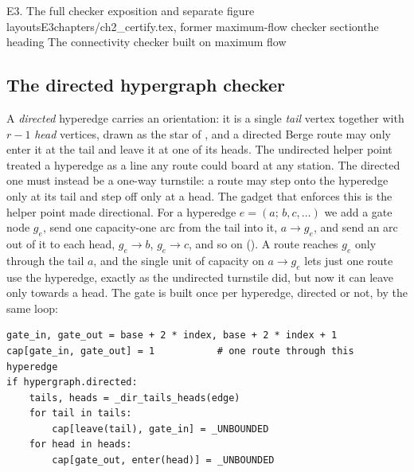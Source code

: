 \begin{offcut}{E3. The full checker exposition and separate figure layouts}{E3}{chapters/ch2\_certify.tex, former maximum-flow checker section}{the heading The connectivity checker built on maximum flow}
\subsection{The directed hypergraph checker}
A \emph{directed} hyperedge carries an orientation: it is a single \emph{tail} vertex together with $r-1$ \emph{head} vertices, drawn as the star of , and a directed Berge route may only enter it at the tail and leave it at one of its heads. The undirected helper point treated a hyperedge as a line any route could board at any station. The directed one must instead be a one-way turnstile: a route may step onto the hyperedge only at its tail and step off only at a head. The gadget that enforces this is the helper point made directional. For a hyperedge $e = (a;\, b, c, \dots)$ we add a gate node $g_e$, send one capacity-one arc from the tail into it, $a \to g_e$, and send an arc out of it to each head, $g_e \to b$, $g_e \to c$, and so on (). A route reaches $g_e$ only through the tail $a$, and the single unit of capacity on $a \to g_e$ lets just one route use the hyperedge, exactly as the undirected turnstile did, but now it can leave only towards a head. The gate is built once per hyperedge, directed or not, by the same loop:

\begin{lstlisting}[caption={The gate loop behind \Cref{fig:hyper-gadget} and \Cref{fig:dir-hyper-gadget}: one capacity-one gate per hyperedge, wired one-way for a directed hyperedge and both ways for an undirected one.}, label={offcut:lst:gate}]
gate_in, gate_out = base + 2 * index, base + 2 * index + 1
cap[gate_in, gate_out] = 1           # one route through this hyperedge
if hypergraph.directed:
    tails, heads = _dir_tails_heads(edge)
    for tail in tails:
        cap[leave(tail), gate_in] = _UNBOUNDED
    for head in heads:
        cap[gate_out, enter(head)] = _UNBOUNDED
\end{lstlisting}


\end{offcut}

